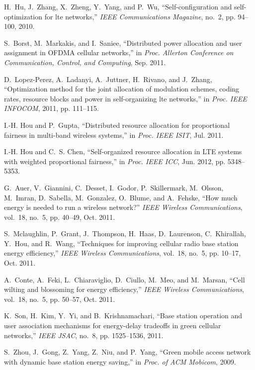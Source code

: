 \documentclass[conference]{IEEEtran}
\begin{document}
\begin{thebibliography}{10}
H.~Hu, J.~Zhang, X.~Zheng, Y.~Yang, and P.~Wu, ``Self-configuration and
  self-optimization for lte networks,'' \emph{IEEE Communications Magazine},
  no.~2, pp. 94--100, 2010.

S.~Borst, M.~Markakis, and I.~Saniee, ``Distributed power allocation and user
  assignment in {OFDMA} cellular networks,'' in \emph{Proc. Allerton Conference on
  Communication, Control, and Computing}, Sep. 2011.

D.~Lopez-Perez, A.~Ladanyi, A.~Juttner, H.~Rivano, and J.~Zhang, ``Optimization
  method for the joint allocation of modulation schemes, coding rates, resource
  blocks and power in self-organizing lte networks,'' in \emph{Proc.  IEEE INFOCOM},
  2011, pp. 111--115.

I.-H. Hou and P.~Gupta, ``Distributed resource allocation for proportional
  fairness in multi-band wireless systems,'' in \emph{Proc. IEEE ISIT}, Jul. 2011.

I.-H. Hou and C.~S. Chen, ``Self-organized resource allocation in {LTE} systems
  with weighted proportional fairness,'' in \emph{Proc. IEEE ICC}, Jun. 2012, pp. 5348--5353. 

G.~Auer, V.~Giannini, C.~Desset, I.~Godor, P.~Skillermark, M.~Olsson, M.~Imran,
  D.~Sabella, M.~Gonzalez, O.~Blume, and A.~Fehske, ``How much energy is needed
  to run a wireless network?'' \emph{IEEE Wireless Communications}, vol.~18,
  no.~5, pp. 40--49, Oct. 2011.

S.~Mclaughlin, P.~Grant, J.~Thompson, H.~Haas, D.~Laurenson, C.~Khirallah,
  Y.~Hou, and R.~Wang, ``Techniques for improving cellular radio base station
  energy efficiency,'' \emph{IEEE Wireless Communications}, vol.~18, no.~5, pp.
  10--17, Oct. 2011.

A.~Conte, A.~Feki, L.~Chiaraviglio, D.~Ciullo, M.~Meo, and M.~Marsan, ``Cell
  wilting and blossoming for energy efficiency,'' \emph{IEEE Wireless
  Communications}, vol.~18, no.~5, pp. 50--57, Oct. 2011.

K.~Son, H.~Kim, Y.~Yi, and B.~Krishnamachari, ``Base station operation and user
  association mechanisms for energy-delay tradeoffs in green cellular
  networks,'' \emph{IEEE JSAC}, no.~8, pp. 1525--1536, 2011.

S.~Zhou, J.~Gong, Z.~Yang, Z.~Niu, and P.~Yang, ``Green mobile access network
  with dynamic base station energy saving,'' in \emph{Proc. of ACM Mobicom},
  2009.


\end{thebibliography}
\end{document}
